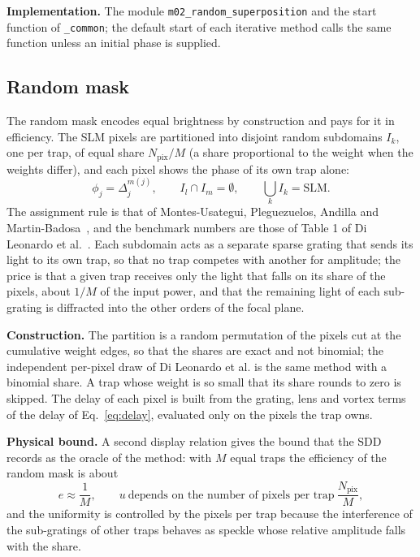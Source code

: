 \textbf{Implementation.} The module \texttt{m02\_random\_superposition} and the start function of \texttt{\_common}; the default start of each iterative method calls the same function unless an initial phase is supplied.

\subsection{Random mask}\label{sec:m03}

The random mask encodes equal brightness by construction and pays for it in efficiency. The SLM pixels are partitioned into disjoint random subdomains $I_k$, one per trap, of equal share $N_{\mathrm{pix}}/M$ (a share proportional to the weight when the weights differ), and each pixel shows the phase of its own trap alone:
\begin{equation}
\phi_j=\Delta_j^{m(j)},\qquad I_l\cap I_m=\emptyset,\qquad \bigcup_k I_k=\text{SLM}.
\label{eq:m03}
\end{equation}
The assignment rule is that of Montes-Usategui, Pleguezuelos, Andilla and Martin-Badosa~\cite{montes2006}, and the benchmark numbers are those of Table 1 of Di Leonardo et al.~\cite{dileonardo}. Each subdomain acts as a separate sparse grating that sends its light to its own trap, so that no trap competes with another for amplitude; the price is that a given trap receives only the light that falls on its share of the pixels, about $1/M$ of the input power, and that the remaining light of each sub-grating is diffracted into the other orders of the focal plane.

\textbf{Construction.} The partition is a random permutation of the pixels cut at the cumulative weight edges, so that the shares are exact and not binomial; the independent per-pixel draw of Di Leonardo et al. is the same method with a binomial share. A trap whose weight is so small that its share rounds to zero is skipped. The delay of each pixel is built from the grating, lens and vortex terms of the delay of Eq.~\eqref{eq:delay}, evaluated only on the pixels the trap owns.

\textbf{Physical bound.} A second display relation gives the bound that the SDD records as the oracle of the method: with $M$ equal traps the efficiency of the random mask is about
\begin{equation}
e\approx\frac{1}{M},\qquad u\ \text{depends on the number of pixels per trap}\ \frac{N_{\mathrm{pix}}}{M},
\label{eq:m03-bound}
\end{equation}
and the uniformity is controlled by the pixels per trap because the interference of the sub-gratings of other traps behaves as speckle whose relative amplitude falls with the share.

